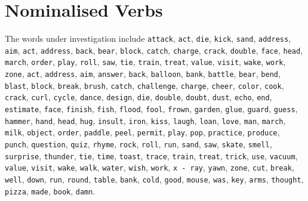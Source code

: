 \documentclass[a4paper,12pt,oneside,openright]{report}
\begin{document}
\section{Nominalised Verbs}\label{section:frozen_verbs}
The words under investigation include
\Verb#attack#, \Verb#act#, \Verb#die#, \Verb#kick#, \Verb#sand#, \Verb#address#, \Verb#aim#, \Verb#act#, \Verb#address#, \Verb#back#, \Verb#bear#, \Verb#block#, \Verb#catch#, \Verb#charge#, \Verb#crack#, \Verb#double#, \Verb#face#, \Verb#head#, \Verb#march#, \Verb#order#, \Verb#play#, \Verb#roll#, \Verb#saw#, \Verb#tie#, \Verb#train#, \Verb#treat#, \Verb#value#, \Verb#visit#, \Verb#wake#, \Verb#work#, \Verb#zone#, \Verb#act#, \Verb#address#, \Verb#aim#, \Verb#answer#, \Verb#back#, \Verb#balloon#, \Verb#bank#, \Verb#battle#, \Verb#bear#, \Verb#bend#, \Verb#blast#, \Verb#block#, \Verb#break#, \Verb#brush#, \Verb#catch#, \Verb#challenge#, \Verb#charge#, \Verb#cheer#, \Verb#color#, \Verb#cook#, \Verb#crack#, \Verb#curl#, \Verb#cycle#, \Verb#dance#, \Verb#design#, \Verb#die#, \Verb#double#, \Verb#doubt#, \Verb#dust#, \Verb#echo#, \Verb#end#, \Verb#estimate#, \Verb#face#, \Verb#finish#, \Verb#fish#, \Verb#flood#, \Verb#fool#, \Verb#frown#, \Verb#garden#, \Verb#glue#, \Verb#guard#, \Verb#guess#, \Verb#hammer#, \Verb#hand#, \Verb#head#, \Verb#hug#, \Verb#insult#, \Verb#iron#, \Verb#kiss#, \Verb#laugh#, \Verb#loan#, \Verb#love#, \Verb#man#, \Verb#march#, \Verb#milk#, \Verb#object#, \Verb#order#, \Verb#paddle#, \Verb#peel#, \Verb#permit#, \Verb#play#, \Verb#pop#, \Verb#practice#, \Verb#produce#, \Verb#punch#, \Verb#question#, \Verb#quiz#, \Verb#rhyme#, \Verb#rock#, \Verb#roll#, \Verb#run#, \Verb#sand#, \Verb#saw#, \Verb#skate#, \Verb#smell#, \Verb#surprise#, \Verb#thunder#, \Verb#tie#, \Verb#time#, \Verb#toast#, \Verb#trace#, \Verb#train#, \Verb#treat#, \Verb#trick#, \Verb#use#, \Verb#vacuum#, \Verb#value#, \Verb#visit#, \Verb#wake#, \Verb#walk#, \Verb#water#, \Verb#wish#, \Verb#work#, \Verb#x - ray#, \Verb#yawn#, \Verb#zone#, \Verb#cut#, \Verb#break#, \Verb#well#, \Verb#down#, \Verb#run#, \Verb#round#, \Verb#table#, \Verb#bank#, \Verb#cold#, \Verb#good#, \Verb#mouse#, \Verb#was#, \Verb#key#, \Verb#arms#, \Verb#thought#, \Verb#pizza#, \Verb#made#, \Verb#book#, \Verb#damn#.
\end{document}
